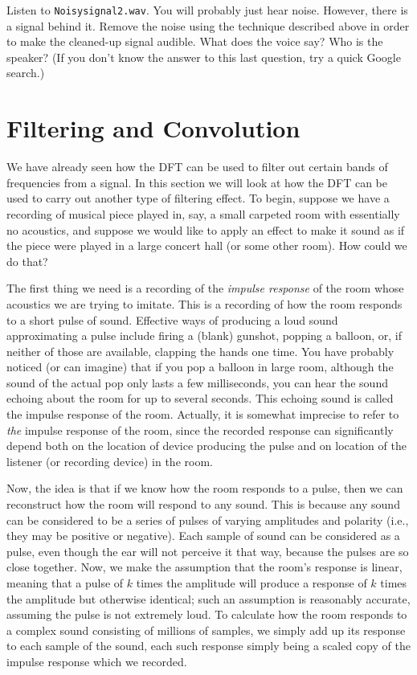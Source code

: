 \begin{problem}
Listen to \texttt{Noisysignal2.wav}.
You will probably just hear noise.
However, there is a signal behind it.
Remove the noise using the technique described above in order to make the cleaned-up signal audible.
What does the voice say?
Who is the speaker?
(If you don't know the answer to this last question, try a quick Google search.)
\end{problem}


\section*{Filtering and Convolution}

We have already seen how the DFT can be used to filter out certain bands of frequencies from a signal.
In this section we will look at how the DFT can be used to carry out another type of filtering effect.
To begin, suppose we have a recording of musical piece played in, say, a small carpeted room with essentially no acoustics, and suppose we would like to apply an effect to make it sound as if the piece were played in a large concert hall (or some other room).
How could we do that?

The first thing we need is a recording of the \emph{impulse response} of the room whose acoustics we are trying to imitate.
This is a recording of how the room responds to a short pulse of sound.
Effective ways of producing a loud sound approximating a pulse include firing a (blank) gunshot, popping a balloon, or, if neither of those are available, clapping the hands one time.
You have probably noticed (or can imagine) that if you pop a balloon in large room, although the sound of the actual pop only lasts a few milliseconds, you can hear the sound echoing about the room for up to several seconds.
This echoing sound is called the impulse response of the room.
Actually, it is somewhat imprecise to refer to \emph{the} impulse response of the room, since the recorded response can significantly depend both on the location of device producing the pulse and on location of the listener (or recording device) in the room.

Now, the idea is that if we know how the room responds to a pulse, then we can reconstruct how the room will respond to any sound.
This is because any sound can be considered to be a series of pulses of varying amplitudes and polarity (i.e., they may be positive or negative).
Each sample of sound can be considered as a pulse, even though the ear will not perceive it that way, because the pulses are so close together.
Now, we make the assumption that the room's response is linear, meaning that a pulse of $k$ times the amplitude will produce a response of $k$ times the amplitude but otherwise identical; such an assumption is reasonably accurate, assuming the pulse is not extremely loud.
To calculate how the room responds to a complex sound consisting of millions of samples, we simply add up its response to each sample of the sound, each such response simply being a scaled copy of the impulse response which we recorded.

